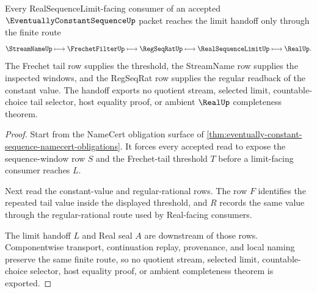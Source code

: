 \begin{theorem}
\label{thm:eventually-constant-sequence-tail-filter-handoff}
Every RealSequenceLimit-facing consumer of an accepted $\EventuallyConstantSequenceUp$ packet reaches the limit handoff only through the finite route
$$
\StreamNameUp \longmapsto \FrechetFilterUp \longmapsto \RegSeqRatUp \longmapsto \RealSequenceLimitUp \longmapsto \RealUp .
$$
The Frechet tail row supplies the threshold, the StreamName row supplies the inspected windows, and the RegSeqRat row supplies the regular readback of the constant value. The handoff exports no quotient stream, selected limit, countable-choice tail selector, host equality proof, or ambient $\RealUp$ completeness theorem.
\end{theorem}
\begin{proof}
Start from the NameCert obligation surface of \autoref{thm:eventually-constant-sequence-namecert-obligations}. It forces every accepted read to expose the sequence-window row $S$ and the Frechet-tail threshold $T$ before a limit-facing consumer reaches $L$.

Next read the constant-value and regular-rational rows. The row $F$ identifies the repeated tail value inside the displayed threshold, and $R$ records the same value through the regular-rational route used by Real-facing consumers.

The limit handoff $L$ and Real seal $A$ are downstream of those rows. Componentwise transport, continuation replay, provenance, and local naming preserve the same finite route, so no quotient stream, selected limit, countable-choice selector, host equality proof, or ambient completeness theorem is exported.
\end{proof}

